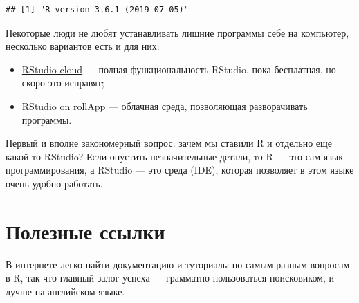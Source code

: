 \documentclass[]{book}
\newenvironment{Shaded}{\begin{snugshade}}{\end{snugshade}}
\newcommand{\KeywordTok}[1]{\textcolor[rgb]{0.13,0.29,0.53}{\textbf{#1}}}
\newcommand{\NormalTok}[1]{#1}
\newcommand{\OperatorTok}[1]{\textcolor[rgb]{0.81,0.36,0.00}{\textbf{#1}}}
\providecommand{\tightlist}{%
  \setlength{\itemsep}{0pt}\setlength{\parskip}{0pt}}
\begin{document}
\begin{Shaded}
\end{Shaded}

\begin{verbatim}
## [1] "R version 3.6.1 (2019-07-05)"
\end{verbatim}

Некоторые люди не любят устанавливать лишние программы себе на компьютер, несколько вариантов есть и для них:

\begin{itemize}
\tightlist
\item
  \href{https://rstudio.cloud/}{RStudio cloud} --- полная функциональность RStudio, пока бесплатная, но скоро это исправят;
\item
  \href{https://www.rollapp.com/app/rstudio}{RStudio on rollApp} --- облачная среда, позволяющая разворачивать программы.
\end{itemize}

Первый и вполне закономерный вопрос: зачем мы ставили R и отдельно еще какой-то RStudio?
Если опустить незначительные детали, то R --- это сам язык программирования, а RStudio --- это среда (IDE), которая позволяет в этом языке очень удобно работать.

\hypertarget{section-2}{%
\section{Полезные ссылки}\label{section-2}}

В интернете легко найти документацию и туториалы по самым разным вопросам в R, так что главный залог успеха --- грамматно пользоваться поисковиком, и лучше на английском языке.
\end{document}
